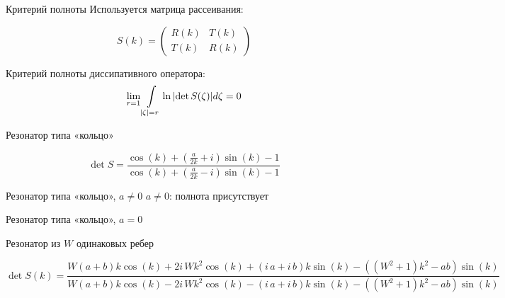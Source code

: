 \documentclass{beamer}
\begin{document}
\begin{frame}{Критерий полноты}
Используется матрица рассеивания:

\[
S(k) = \begin{pmatrix} R(k) & T(k) \\ T(k) & R(k) \end{pmatrix}
\]

Критерий полноты диссипативного оператора:
\[
\lim\limits_{r = 1} \int\limits_{\abs{\zeta} = r} \ln \abs{\det S(\zeta)} d \zeta = 0
\]

\end{frame}


\begin{frame}{Резонатор типа «кольцо»}

\begin{figure}
\begin{tikzpicture}[scale=0.5]

\end{tikzpicture}
\end{figure}

\[
\det S = 
\frac
{\cos\left(k\right) + {\left(\frac{a}{2 k} + i\right)} \sin\left(k\right) - 1}
{\cos\left(k\right) + {\left(\frac{a}{2 k} - i\right)} \sin\left(k\right) - 1}
\]

\end{frame}

\begin{frame}{Резонатор типа «кольцо», $a \ne 0$}
$a \ne 0$: полнота присутствует


\end{frame}

\begin{frame}{Резонатор типа «кольцо», $a = 0$}
\end{frame}





\begin{frame}{Резонатор из $W$ одинаковых ребер}

\begin{figure}
\begin{tikzpicture}[scale=0.5]

\end{tikzpicture}
\end{figure}

{
\scriptsize
\[
\det S(k) = \frac{W {\left(a + b\right)} k \cos\left(k\right) + 2 i \, W k^{2} \cos\left(k\right) + {\left(i \, a + i \, b\right)} k \sin\left(k\right) - {\left({\left(W^{2} + 1\right)} k^{2} - a b\right)} \sin\left(k\right)}{W {\left(a + b\right)} k \cos\left(k\right) - 2 i \, W k^{2} \cos\left(k\right) - {\left(i \, a + i \, b\right)} k \sin\left(k\right) - {\left({\left(W^{2} + 1\right)} k^{2} - a b\right)} \sin\left(k\right)}
\]
}

\end{frame}
\end{document}
